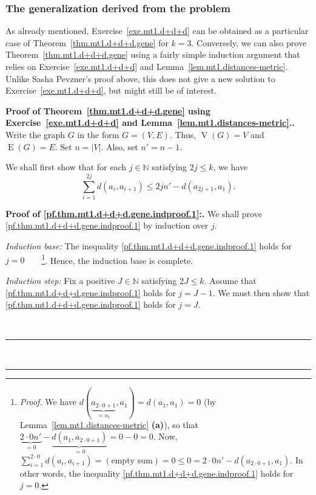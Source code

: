 \documentclass[numbers=enddot,12pt,final,onecolumn,notitlepage]{scrartcl}%
\theoremstyle{definition}
\newenvironment{proof}[1][Proof]{\noindent\textbf{#1.} }{\ \rule{0.5em}{0.5em}}
\let\sumnonlimits\sum
\renewcommand{\sum}{\sumnonlimits\limits}
\newcommand{\NN}{\mathbb{N}}
\newcommand{\abs}[1]{\left| #1 \right|}
\newcommand{\tup}[1]{\left( #1 \right)}
\newcommand{\verts}[1]{\operatorname{V}\left( #1 \right)}
\newcommand{\edges}[1]{\operatorname{E}\left( #1 \right)}
\begin{document}
\subsubsection{The generalization derived from the problem}

As already mentioned, Exercise~\ref{exe.mt1.d+d+d} can be obtained
as a particular case of Theorem~\ref{thm.mt1.d+d+d.gene} for $k = 3$.
Conversely, we can also prove Theorem~\ref{thm.mt1.d+d+d.gene} using
a fairly simple induction argument that relies on
Exercise~\ref{exe.mt1.d+d+d} and Lemma~\ref{lem.mt1.distances-metric}.
Unlike Sasha Pevzner's proof above, this does not give a new solution
to Exercise~\ref{exe.mt1.d+d+d}, but might still be of interest.

\begin{proof}[Proof of Theorem~\ref{thm.mt1.d+d+d.gene} using
Exercise~\ref{exe.mt1.d+d+d} and
Lemma~\ref{lem.mt1.distances-metric}.]
Write the graph $G$ in the form $G = \tup{V, E}$.
Thus, $\verts{G} = V$ and $\edges{G} = E$.
Set $n = \abs{V}$.
Also, set $n' = n-1$.

We shall first show that for each $j \in \NN$ satisfying $2j \leq k$,
we have
\begin{equation}
\sum_{i=1}^{2j} d \tup{a_i, a_{i+1}}
\leq 2j n' - d \tup{a_{2j+1}, a_1} .
\label{pf.thm.mt1.d+d+d.gene.indproof.1}
\end{equation}

\begin{proof}[Proof of \eqref{pf.thm.mt1.d+d+d.gene.indproof.1}:]
We shall prove \eqref{pf.thm.mt1.d+d+d.gene.indproof.1} by induction
over $j$.

\textit{Induction base:} The inequality
\eqref{pf.thm.mt1.d+d+d.gene.indproof.1} holds for
$j = 0$\ \ \ \ \footnote{\textit{Proof.} We have
$d \tup{\underbrace{a_{2\cdot 0+1}}_{= a_1}, a_1}
= d \tup{a_1, a_1} = 0$
(by Lemma~\ref{lem.mt1.distances-metric} \textbf{(a)}), so that
$\underbrace{2 \cdot 0 n'}_{= 0}
- \underbrace{d \tup{a_1, a_{2\cdot 0+1}}}_{= 0}
= 0 - 0 = 0$. Now,
$\sum_{i=1}^{2\cdot 0} d \tup{a_i, a_{i+1}}
= \tup{\text{empty sum}} = 0
\leq 0 = 2 \cdot 0 n' - d \tup{a_{2\cdot 0+1}, a_1}$.
In other words, the inequality
\eqref{pf.thm.mt1.d+d+d.gene.indproof.1} holds for $j = 0$.}.
Hence, the induction base is complete.

\textit{Induction step:} Fix a positive $J \in \NN$ satisfying
$2J \leq k$.
Assume that \eqref{pf.thm.mt1.d+d+d.gene.indproof.1} holds for
$j = J-1$.
We must then show that \eqref{pf.thm.mt1.d+d+d.gene.indproof.1} holds
for $j = J$.


\end{proof}
\end{proof}
\end{document}
